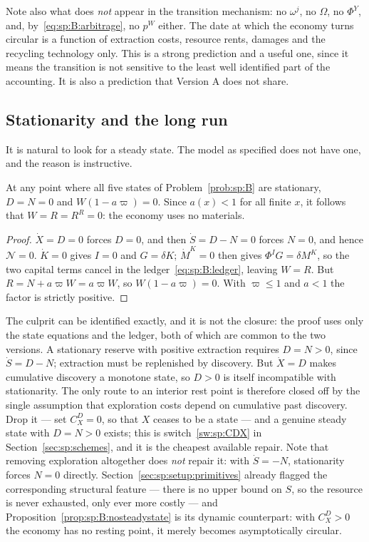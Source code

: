 Note also what does \emph{not} appear in the transition mechanism: no $\omega^j$, no $\Omega$, no
$\Phi^Y$, and, by~\eqref{eq:sp:B:arbitrage}, no $p^W$ either. The date at which the economy turns
circular is a function of extraction costs, resource rents, damages and the recycling technology only.
This is a strong prediction and a useful one, since it means the transition is not sensitive to the
least well identified part of the accounting. It is also a prediction that Version A does not share.


\subsection{Stationarity and the long run}\label{sec:sp:B:longrun}

It is natural to look for a steady state. The model as specified does not have one, and the reason is
instructive.

\begin{proposition}\label{prop:sp:B:nosteadystate}
At any point where all five states of Problem~\ref{prob:sp:B} are stationary, $D=N=0$ and
$W\left(1-a\varpi\right)=0$. Since $a(x)<1$ for all finite $x$, it follows that $W=R=R^R=0$: the economy
uses no materials.
\end{proposition}

\begin{proof}
$\dot X=D=0$ forces $D=0$, and then $\dot S=D-N=0$ forces $N=0$, and hence $\mathcal N=0$. $\dot K=0$
gives $I=0$ and $G=\delta K$; $\dot M^K=0$ then gives $\Phi^IG=\delta M^K$, so the two capital terms
cancel in the ledger~\eqref{eq:sp:B:ledger}, leaving $W=R$. But $R=N+a\varpi W=a\varpi W$, so
$W\left(1-a\varpi\right)=0$. With $\varpi\le1$ and $a<1$ the factor is strictly positive.
\end{proof}

The culprit can be identified exactly, and it is not the closure: the proof uses only the state
equations and the ledger, both of which are common to the two versions. A stationary reserve with
positive extraction requires $D=N>0$, since $\dot S=D-N$; extraction must be replenished by discovery.
But $\dot X=D$ makes cumulative discovery a monotone state, so $D>0$ is itself incompatible with
stationarity. The only route to an interior rest point is therefore closed off by the single assumption
that exploration costs depend on cumulative past discovery. Drop it --- set $C^D_X=0$, so that $X$
ceases to be a state --- and a genuine steady state with $D=N>0$ exists; this is
switch~\ref{sw:sp:CDX} in Section~\ref{sec:sp:schemes}, and it is the cheapest available repair. Note
that removing exploration altogether does \emph{not} repair it: with $\dot S=-N$, stationarity forces
$N=0$ directly. Section~\ref{sec:sp:setup:primitives} already flagged the corresponding structural
feature --- there is no upper bound on $S$, so the resource is never exhausted, only ever more costly ---
and Proposition~\ref{prop:sp:B:nosteadystate} is its dynamic counterpart: with $C^D_X>0$ the economy has
no resting point, it merely becomes asymptotically circular.

